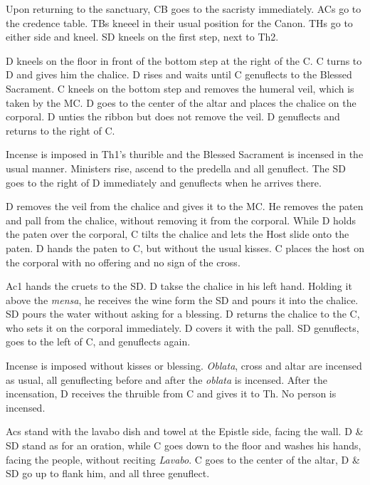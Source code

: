 {    \rubric Upon returning to the sanctuary, CB goes to the sacristy
    immediately. ACs go to the credence table. TBs kneeel in their usual
    position for the Canon. THs go to either side and kneel. SD kneels on the
    first step, next to Th2.

    \rubric D kneels on the floor in front of the bottom step at the right of
    the C. C turns to D and gives him the chalice. D rises and waits until C
    genuflects to the Blessed Sacrament. C kneels on the bottom step and
    removes the humeral veil, which is taken by the MC. D goes to the center of
    the altar and places the chalice on the corporal. D unties the ribbon but
    does not remove the veil. D genuflects and returns to the right of C.

    \rubric Incense is imposed in Th1's thurible and the Blessed Sacrament is
    incensed in the usual manner. Ministers rise, ascend to the predella and
    all genuflect. The SD goes to the right of D immediately and genuflects
    when he arrives there.

    \rubric D removes the veil from the chalice and gives it to the MC. He
    removes the paten and pall from the chalice, without removing it from the
    corporal. While D holds the paten over the corporal, C tilts the chalice
    and lets the Host slide onto the paten. D hands the paten to C, but without
    the usual kisses. C places the host on the corporal with no offering and no
    sign of the cross.

    \rubric Ac1 hands the cruets to the SD. D takse the chalice in his left
    hand. Holding it above the \textit{mensa}, he receives the wine form the SD
    and pours it into the chalice. SD pours the water without asking for a
    blessing. D returns the chalice to the C, who sets it on the corporal
    immediately. D covers it with the pall. SD genuflects, goes to the left of
    C, and genuflects again.

    \rubric Incense is imposed without kisses or blessing. \textit{Oblata},
    cross and altar are incensed as usual, all genuflecting before and after
    the \textit{oblata} is incensed. After the incensation, D receives the
    thruible from C and gives it to Th. No person is incensed.

    \rubric Acs stand with the lavabo dish and towel at the Epistle side,
    facing the wall. D \& SD stand as for an oration, while C goes down to the
    floor and washes his hands, facing the people, without reciting
    \textit{Lavabo}. C goes to the center of the altar, D \& SD go up to flank
    him, and all three genuflect.

}
